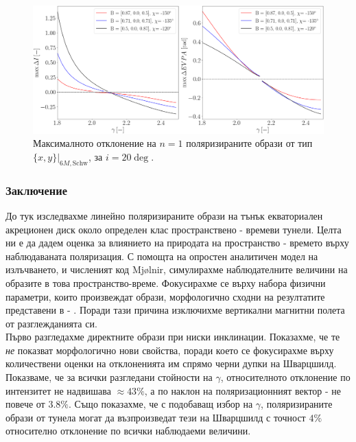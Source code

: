 \begin{figure}[!htb]
	\centering
	\includegraphics[scale = 0.25]{WH_20_deg_param_sweep_n1.png}
	\caption[Максималното отклонение на $n=1$ поляризираните образи от тип $\{x,y\}\vert_{6M, \text{Schw}}$, за $i = 20\deg$]{\small Максималното отклонение на $n=1$ поляризираните образи от тип $\{x,y\}\vert_{6M, \text{Schw}}$, за $i = 20\deg$.} 
	\label{WH_max_deviation_20_deg_n1}
\end{figure}
\newpage

\subsubsection{Заключение}

До тук изследвахме линейно поляризираните образи на тънък екваториален акреционен диск около определен клас пространствено - времеви тунели. Целта ни е да дадем оценка за влиянието на природата на пространство - времето върху наблюдаваната поляризация. С помощта на опростен аналитичен модел на излъчването, и численият код Mjølnir, симулирахме наблюдателните величини на образите в това пространство-време. Фокусирахме се върху набора физични параметри, които произвеждат образи, морфологично сходни на резултатите представени в \cite{EHT_M87_I} - \cite{EHT_M87_VIII}. Поради тази причина изключихме вертикални магнитни полета от разглежданията си.\\

Първо разгледахме директните образи при ниски инклинации. Показахме, че те \emph{не} показват морфологично нови свойства, поради което се фокусирахме върху количествени оценки на отклоненията им спрямо черни дупки на Шварцшилд. Показваме, че за всички разгледани стойности на $\gamma$, относителното отклонение по интензитет не надвишава $\approx 43\%$, а по наклон на поляризационният вектор - не повече от $3.8\%$. Също показахме, че с подобаващ избор на $\gamma$, поляризираните образи от тунела могат да възпроизведат тези на Шварцшилд с точност $4\%$ относително отклонение по всички наблюдаеми величини. \\

